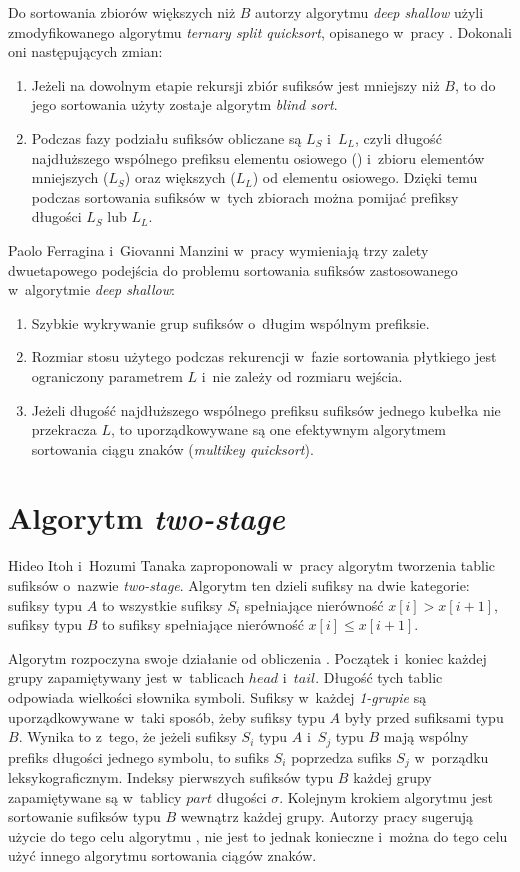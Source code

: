 Do sortowania zbiorów większych niż $B$ autorzy algorytmu \emph{deep shallow}
użyli zmodyfikowanego algorytmu \emph{ternary split quicksort}, opisanego w~pracy \cite{bentley-sort}. Dokonali oni następujących zmian:
\begin{enumerate}
  \item Jeżeli na dowolnym etapie rekursji zbiór sufiksów jest mniejszy niż
  $B$, to do jego sortowania użyty zostaje algorytm \emph{blind sort}.
  \item Podczas fazy podziału sufiksów obliczane są $L_S$ i~$L_L$, czyli
  długość najdłuższego wspólnego prefiksu elementu osiowego () i~zbioru elementów mniejszych ($L_S$) oraz większych ($L_L$) od elementu
  osiowego. Dzięki temu podczas sortowania sufiksów w~tych zbiorach można
  pomijać prefiksy długości $L_S$ lub $L_L$.
\end{enumerate}

Paolo Ferragina i~Giovanni Manzini w~pracy \cite{MF} wymieniają trzy zalety
dwuetapowego podejścia do problemu sortowania sufiksów zastosowanego w~algorytmie \emph{deep shallow}:
\begin{enumerate}
  \item Szybkie wykrywanie grup sufiksów o~długim wspólnym prefiksie.
  \item Rozmiar stosu użytego podczas rekurencji w~fazie sortowania płytkiego
  jest ograniczony parametrem $L$ i~nie zależy od rozmiaru wejścia.
  \item Jeżeli długość najdłuższego wspólnego prefiksu sufiksów jednego kubełka
  nie przekracza $L$, to uporządkowywane są one efektywnym algorytmem
  sortowania ciągu znaków (\emph{multikey quicksort}).
\end{enumerate}
 
 
\section{Algorytm \emph{two-stage}}

Hideo Itoh i~Hozumi Tanaka zaproponowali w~pracy \cite{IT} algorytm tworzenia
tablic sufiksów o~nazwie \emph{two-stage}. Algorytm ten dzieli sufiksy na dwie
kategorie: sufiksy typu $A$ to wszystkie sufiksy $S_i$ spełniające nierówność $x[i] > x[i+1]$,
sufiksy typu $B$ to sufiksy spełniające nierówność $x[i] \leq x[i+1]$.
 
Algorytm rozpoczyna swoje działanie od obliczenia . Początek i~koniec
każdej grupy zapamiętywany jest w~tablicach $\mathit{head}$ i~$\mathit{tail}$. Długość tych tablic odpowiada wielkości słownika symboli.
Sufiksy w~każdej \emph{1-grupie} są uporządkowywane w~taki sposób, żeby sufiksy typu $A$
były przed sufiksami typu $B$. Wynika to z~tego, że jeżeli sufiksy $S_i$ typu $A$ i~$S_j$ typu $B$ mają wspólny prefiks długości jednego symbolu, to sufiks $S_i$ poprzedza sufiks $S_j$ w~porządku leksykograficznym. Indeksy pierwszych sufiksów typu $B$ każdej
grupy zapamiętywane są w~tablicy $\mathit{part}$ długości $\sigma$.
Kolejnym krokiem algorytmu jest sortowanie sufiksów typu $B$ wewnątrz każdej
grupy. Autorzy pracy \cite{IT} sugerują użycie do tego celu algorytmu
\cite{bentley}, nie jest to jednak konieczne i~można do tego celu użyć innego
algorytmu sortowania ciągów znaków. 


